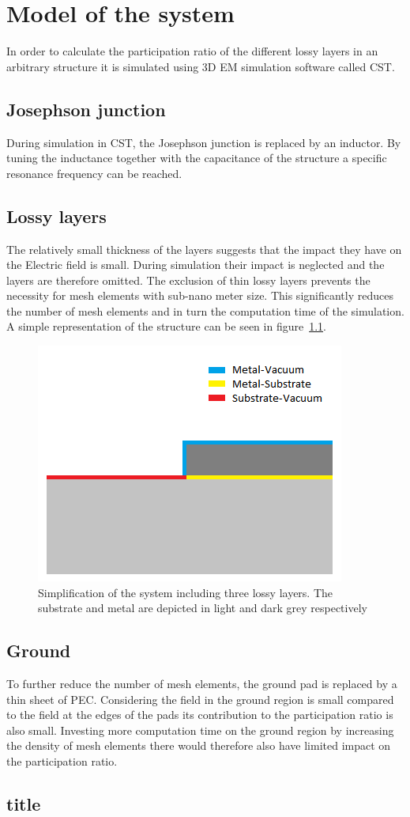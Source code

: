 \chapter{Model of the system}
In order to calculate the participation ratio of the different lossy layers in an arbitrary structure it is simulated using 3D EM simulation software called CST.


\section{Josephson junction}
During simulation in CST, the Josephson junction is replaced by an inductor. By tuning the inductance together with the capacitance of the structure a specific resonance frequency can be reached.


\section{Lossy layers}
The relatively small thickness of the layers suggests that the impact they have on the Electric field is small. During simulation their impact is neglected and the layers are therefore omitted. The exclusion of thin lossy layers prevents the necessity for mesh elements with sub-nano meter size. This significantly reduces the number of mesh elements and in turn the computation time of the simulation. A simple representation of the structure can be seen in figure~\ref{fig:model}.
\begin{figure}
\includegraphics[scale=.8]{Figures/model}
\caption{Simplification of the system including three lossy layers. The substrate and metal are depicted in light and dark grey respectively}
\label{fig:model}
\end{figure}


\section{Ground}
To further reduce the number of mesh elements, the ground pad is replaced by a thin sheet of PEC. Considering the field in the ground region is small compared to the field at the edges of the pads its contribution to the participation ratio is also small. Investing more computation time on the ground region by increasing the density of mesh elements there would therefore also have limited impact on the participation ratio.
\section{title}